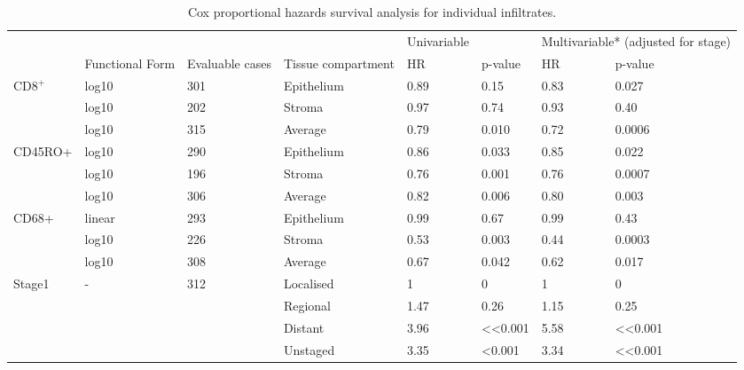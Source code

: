 \begin{landscape}
\begin{table}[]
    \centering
    \begin{tabular}{llllllll}
    
		& & &&		Univariable && \multicolumn{2}{c}{	Multivariable* 
(adjusted for stage)} \\
								
&	Functional Form &	Evaluable cases&	Tissue compartment&	HR &	p-value	& HR &	p-value	\\ \hline
CD8$^+$&	log10 &	301	&Epithelium&	0.89&	0.15&	0.83&	0.027\\	
&	log10&	202&	Stroma&	0.97&	0.74&	0.93&	0.40\\	
&	log10&	315&	Average&	0.79&	0.010&	0.72&	0.0006\\	
CD45RO+&	log10&	290&	Epithelium&	0.86&	0.033&	0.85&	0.022\\	
	&log10&	196&	Stroma&	0.76&	0.001&	0.76&	0.0007\\	
	&log10&	306&	Average&	0.82&	0.006&	0.80&	0.003\\	
CD68+&	linear&	293&	Epithelium&	0.99&	0.67&	0.99&	0.43\\	
&	log10&	226	&Stroma	&0.53&	0.003&	0.44&	0.0003	\\
&	log10&	308	&Average&	0.67&	0.042&	0.62&	0.017\\	
Stage1 & - &	312&	Localised&	1&	0&	1&	0	\\
	& & &		Regional&	1.47&	0.26&	1.15&	0.25\\	
	&	&&	Distant	&3.96&	<<0.001&	5.58&	<<0.001	\\
	&	&&	Unstaged&	3.35&	<0.001&	3.34&	<<0.001	\\ \hline

\end{tabular}
    \caption[Individual immune infiltrates Cox regression]{Cox proportional hazards survival analysis for individual infiltrates.}
    \label{tab:coxsurv}
\end{table}
\end{landscape}

